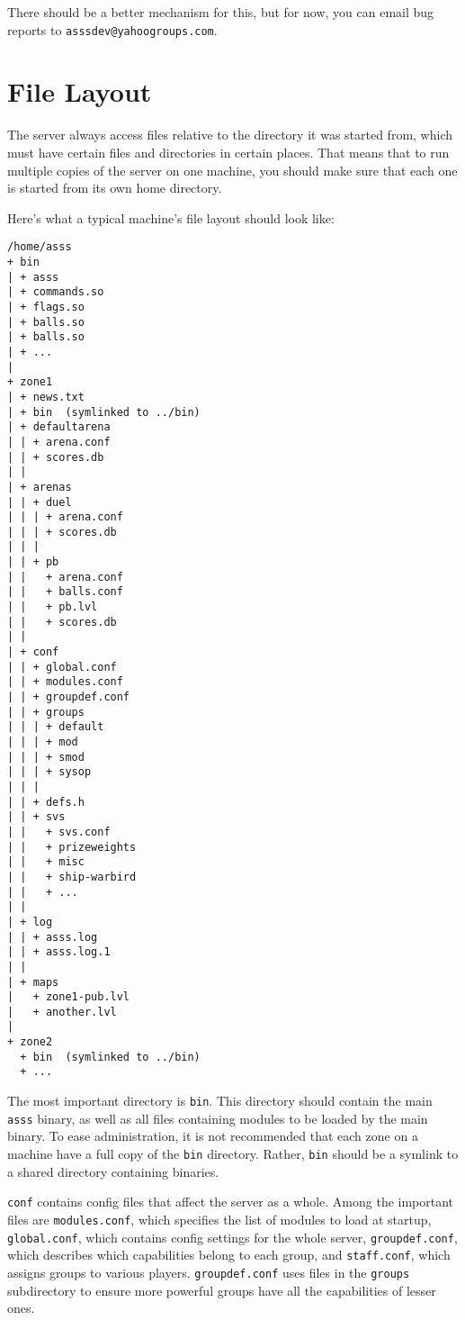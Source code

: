 \documentclass{article}
\newcommand{\asss}{\texttt{asss}}
\begin{document}
There should be a better mechanism for this, but for now, you can email
bug reports to \verb/asssdev@yahoogroups.com/.


\section{File Layout}
The server always access files relative to the directory it was started
from, which must have certain files and directories in certain places.
That means that to run multiple copies of the server on one machine, you
should make sure that each one is started from its own home directory.

Here's what a typical machine's file layout should look like:
\begin{verbatim}
/home/asss
+ bin
| + asss
| + commands.so
| + flags.so
| + balls.so
| + balls.so
| + ...
|
+ zone1 
| + news.txt
| + bin  (symlinked to ../bin)
| + defaultarena
| | + arena.conf
| | + scores.db
| |
| + arenas
| | + duel
| | | + arena.conf
| | | + scores.db
| | |
| | + pb
| |   + arena.conf
| |   + balls.conf
| |   + pb.lvl
| |   + scores.db
| |
| + conf
| | + global.conf
| | + modules.conf
| | + groupdef.conf
| | + groups
| | | + default
| | | + mod
| | | + smod
| | | + sysop
| | |
| | + defs.h
| | + svs
| |   + svs.conf
| |   + prizeweights
| |   + misc
| |   + ship-warbird
| |   + ...
| |
| + log
| | + asss.log
| | + asss.log.1
| |
| + maps
|   + zone1-pub.lvl
|   + another.lvl
|
+ zone2
  + bin  (symlinked to ../bin)
  + ...
\end{verbatim}

The most important directory is \verb/bin/. This directory should
contain the main \asss{} binary, as well as all files containing modules
to be loaded by the main binary. To ease administration, it is not
recommended that each zone on a machine have a full copy of the
\verb/bin/ directory. Rather, \verb/bin/ should be a symlink to a shared
directory containing binaries.

\verb/conf/ contains config files that affect the server as a whole.
Among the important files are \verb/modules.conf/, which specifies the
list of modules to load at startup, \verb/global.conf/, which contains
config settings for the whole server, \verb/groupdef.conf/, which
describes which capabilities belong to each group, and
\verb/staff.conf/, which assigns groups to various players.
\verb/groupdef.conf/ uses files in the \verb/groups/ subdirectory to
ensure more powerful groups have all the capabilities of lesser ones.
\end{document}
